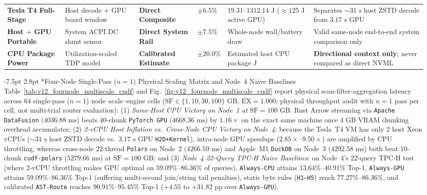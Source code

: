 \documentclass[10pt,a4paper]{article}
\makeatletter
\renewcommand\subsection{\@startsection{subsection}{2}{\z@}%
  {-7.5pt \@plus -2pt \@minus -1pt}%
  {2.8pt \@plus 1pt}%
  {\normalfont\normalsize\bfseries}}
\makeatother
\begin{document}
\begin{table}[htbp]
{\begin{tabular}{@{}llllll@{}}
\textbf{Tesla T4 Full-Stage} & Host decode $+$ GPU board window & \textbf{Direct Composite} & $\pm 6.5\%$ & $19.31\text{--}1312.14\text{ J}$ ($\approx 125\text{ J}$ active GPU) & Separates $\sim 31\text{ s}$ host ZSTD decode from $3.17\text{ s}$ GPU \\
\textbf{Host $+$ GPU Portable} & System ACPI DC shunt sensor & \textbf{Direct System Rail} & $\pm 7.5\%$ & Whole-node wall/battery draw & Valid same-node end-to-end system comparison only \\
\textbf{CPU Package Power} & Utilization-scaled TDP model & \textbf{Calibrated Estimate} & $\pm 20.0\%$ & Estimated host CPU package J & \textbf{Directional context only}; never compared as direct NVML \\
\bottomrule
\end{tabular}%
}
\end{table}

\subsection*{Four-Node Single-Pass ($n=1$) Physical Scaling Matrix and Node~4 Naive Baselines}
Table~\ref{tab:v12_fournode_multiscale_cudf} and Fig.~\ref{fig:v12_fournode_multiscale_cudf} report physical scan-filter-aggregation latency across $64$ single-pass ($n=1$) node--scale--engine cells ($\text{SF} \in \{1, 10, 30, 100\}\text{ GB}$, $\text{EX}=1.000$; physical throughput audit with $n=1$ pass per cell, not multi-trial router evaluation):
(1) \emph{Same-Host CPU Victory on Node~1 at $\text{SF}=100\text{ GB}$}: Rust Arrow streaming via \texttt{Apache DataFusion} ($4036.88\text{ ms}$) beats 40-chunk \texttt{PyTorch GPU} ($4668.36\text{ ms}$) by $1.16\times$ on the exact same machine once $4\text{ GB}$ VRAM chunking overhead accumulates;
(2) \emph{2-vCPU Host Inflation vs.\ Cross-Node CPU Victory on Node~4}: because the Tesla~T4 VM has only 2 host Xeon vCPUs ($\sim 31\text{ s}$ host ZSTD decode vs.\ $3.17\text{ s}$ GPU \texttt{H2D+Kernel}), intra-node GPU speedups ($2.85\times\text{--}9.50\times$) are amplified by CPU throttling, whereas cross-node 22-thread \texttt{Polars} on Node~2 ($4266.59\text{ ms}$) and Apple~M1 \texttt{DuckDB} on Node~3 ($4292.58\text{ ms}$) both beat 10-chunk \texttt{cudf-polars} ($5279.66\text{ ms}$) at $\text{SF}=100\text{ GB}$; and
(3) \emph{Node~4 22-Query TPC-H Naive Baselines}: on Node~4's 22-query TPC-H test (where 2-vCPU throttling makes GPU optimal on $59.09\%\text{--}86.36\%$ of queries), \texttt{Always-CPU} attains $13.64\%\text{--}40.91\%$ Top-1, \texttt{Always-GPU} attains $59.09\%\text{--}86.36\%$ Top-1 (suffering multi-second join/string tail penalties), static byte rules (\texttt{H1--H5}) reach $77.27\%\text{--}86.36\%$, and calibrated \texttt{AST-Route} reaches $90.91\%\text{--}95.45\%$ Top-1 ($+4.55$ to $+31.82$ pp over \texttt{Always-GPU}).
\end{document}
